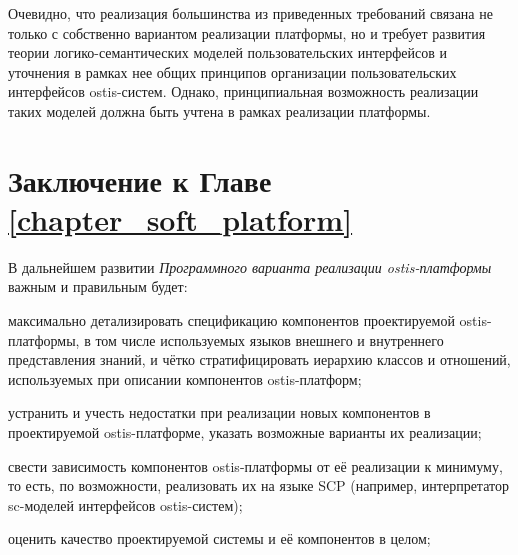 Очевидно, что реализация большинства из приведенных требований связана не только с собственно вариантом реализации платформы, но и требует развития теории логико-семантических моделей пользовательских интерфейсов и уточнения в рамках нее общих принципов организации пользовательских интерфейсов ostis-систем. Однако, принципиальная возможность реализации таких моделей должна быть учтена в рамках реализации платформы.

\section*{Заключение к Главе \ref{chapter_soft_platform}~}
\label{sec_soft_platform_plans_and_tasks}

В дальнейшем развитии \textit{Программного варианта реализации ostis-платформы} важным и правильным будет:
\begin{textitemize}
    \item максимально детализировать спецификацию компонентов проектируемой ostis-платформы, в том числе используемых языков внешнего и внутреннего представления знаний, и чётко стратифицировать иерархию классов и отношений, используемых при описании компонентов ostis-платформ;
    \item устранить и учесть недостатки при реализации новых компонентов в проектируемой ostis-платформе, указать возможные варианты их реализации;
    \item свести зависимость компонентов ostis-платформы от её реализации к минимуму, то есть, по возможности, реализовать их на языке SCP (например, интерпретатор sc-моделей интерфейсов ostis-систем);
    \item оценить качество проектируемой системы и её компонентов в целом;
\end{textitemize}